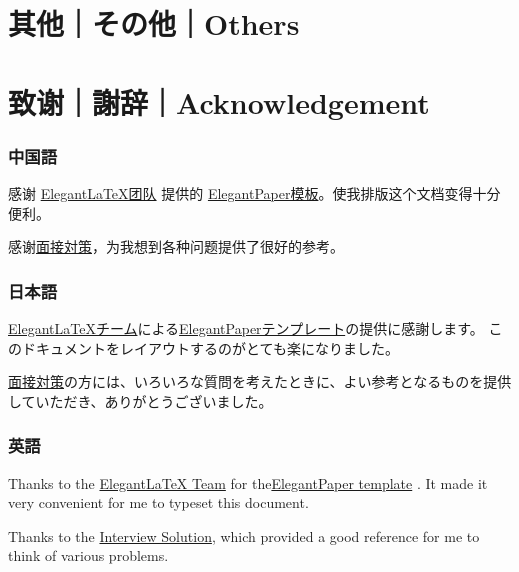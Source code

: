 \documentclass[lang=cn,11pt,a4paper]{elegantpaper}
\begin{document}
\section{其他｜その他｜Others}

\section{致谢｜謝辞｜Acknowledgement}
\subsubsection{中国語}
感谢  \href{https://elegantlatex.org/}{ElegantLaTeX团队} 提供的 \href{https://github.com/ElegantLaTeX/ElegantPaper}{ElegantPaper模板}。使我排版这个文档变得十分便利。

感谢\href{https://hatodove22.notion.site/16f0eba93f3c4153bd1f770892aaf6b1}{面接対策}，为我想到各种问题提供了很好的参考。
\subsubsection{日本語}
\href{https://elegantlatex.org/}{ElegantLaTeXチーム}による\href{https://github.com/ElegantLaTeX/ElegantPaper}{ElegantPaperテンプレート}の提供に感謝します。 このドキュメントをレイアウトするのがとても楽になりました。

\href{https://hatodove22.notion.site/16f0eba93f3c4153bd1f770892aaf6b1}{面接対策}の方には、いろいろな質問を考えたときに、よい参考となるものを提供していただき、ありがとうございました。
\subsubsection{英語}
Thanks to the \href{https://elegantlatex.org/}{ElegantLaTeX Team}  for the\href{https://github.com/ElegantLaTeX/ElegantPaper}{ElegantPaper template} . It made it very convenient for me to typeset this document.

Thanks to the \href{https://hatodove22.notion.site/16f0eba93f3c4153bd1f770892aaf6b1}{Interview Solution}, which provided a good reference for me to think of various problems.


\nocite{*}

\end{document}
